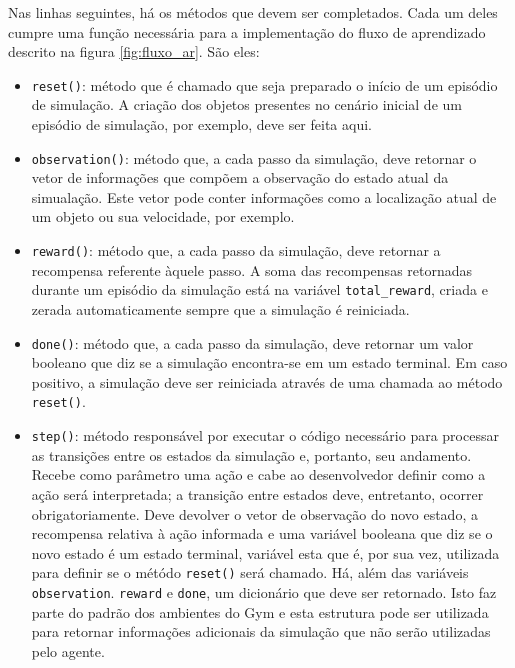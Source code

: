 \documentclass[cic,tc]{iiufrgs}
\begin{document}
Nas linhas seguintes, há os métodos que devem ser completados. Cada um deles
cumpre uma função necessária para a implementação do fluxo de aprendizado
descrito na figura \ref{fig:fluxo_ar}. São eles:

\begin{itemize}
  \item \texttt{reset()}: método que é chamado que seja preparado o início de
  um episódio de simulação. A criação dos objetos presentes no cenário inicial
  de um episódio de simulação, por exemplo, deve ser feita aqui.
  \item \texttt{observation()}: método que, a cada passo da simulação, deve retornar o vetor de informações
  que compõem a observação do estado atual da simualação. Este vetor pode conter
  informações como a localização atual de um objeto ou sua velocidade, por exemplo.
  \item \texttt{reward()}: método que, a cada passo da simulação, deve retornar
  a recompensa referente àquele passo. A soma das recompensas retornadas durante
  um episódio da simulação está na variável \texttt{total\_reward}, criada
  e zerada  automaticamente sempre que a simulação é reiniciada.
  \item \texttt{done()}: método que, a cada passo da simulação, deve retornar
  um valor booleano que diz se a simulação encontra-se em um estado terminal. Em
  caso positivo, a simulação deve ser reiniciada através de uma chamada ao método
  \texttt{reset()}.
  \item \texttt{step()}: método responsável por executar o código necessário para
  processar as transições entre os estados da simulação e, portanto, seu andamento.
  Recebe como parâmetro uma ação e cabe ao desenvolvedor definir como a ação será
  interpretada; a transição entre estados deve, entretanto, ocorrer obrigatoriamente.
  Deve devolver o vetor de observação do novo estado, a recompensa relativa à ação
  informada e uma variável booleana que diz se o novo estado é um estado terminal,
  variável esta que é, por sua vez, utilizada para definir se o métódo \texttt{reset()}
  será chamado. Há, além das variáveis \texttt{observation}. \texttt{reward} e \texttt{done},
  um dicionário que deve ser retornado. Isto faz parte do padrão dos ambientes
  do Gym e esta estrutura pode ser utilizada para retornar informações adicionais
  da simulação que não serão utilizadas pelo agente.
\end{itemize}
\end{document}

